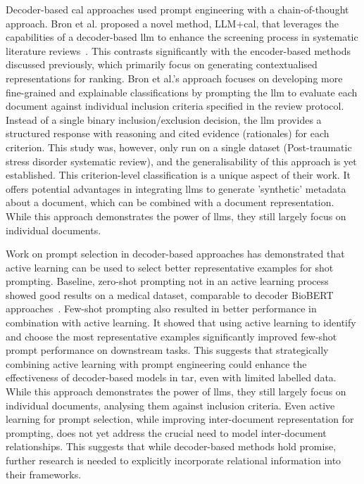 \documentclass[10pt,oneside]{book}
\begin{document}
Decoder-based \gls*{cal} approaches used prompt engineering with a chain-of-thought approach. Bron et al. proposed a novel method, LLM+\gls*{cal}, that leverages the capabilities of  a decoder-based \gls*{llm} to enhance the screening process in systematic literature reviews~\cite{bron_combining_2024}. This contrasts significantly with the encoder-based methods discussed previously, which primarily focus on generating contextualised representations for ranking. Bron et al.'s approach focuses on developing more fine-grained and explainable classifications by prompting the \gls*{llm} to evaluate each document against individual inclusion criteria specified in the review protocol. Instead of a single binary inclusion/exclusion decision, the \gls*{llm} provides a structured response with reasoning and cited evidence (rationales) for each criterion. This study was, however, only run on a single dataset (Post-traumatic stress disorder systematic review), and the generalisability of this approach is yet established. This criterion-level classification is a unique aspect of their work. It offers potential advantages in integrating \gls*{llm}s to generate 'synthetic' metadata about a document, which can be combined with a document representation. While this approach demonstrates the power of \gls*{llm}s, they still largely focus on individual documents.

Work on prompt selection in decoder-based approaches has demonstrated that active learning can be used to select better representative examples for shot prompting.  Baseline, zero-shot prompting not in an active learning process showed good results on a medical dataset, comparable to decoder BioBERT approaches~\cite{wang_zero-shot_2024}. Few-shot prompting also resulted in better performance \cite{margatina_importance_2022} in combination with active learning. It showed that using active learning to identify and choose the most representative examples significantly improved few-shot prompt performance on downstream tasks. This suggests that strategically combining active learning with prompt engineering could enhance the effectiveness of decoder-based models in \gls*{tar}, even with limited labelled data. While this approach demonstrates the power of \gls*{llm}s, they still largely focus on individual documents, analysing them against inclusion criteria. Even active learning for prompt selection, while improving inter-document representation for prompting, does not yet address the crucial need to model inter-document relationships.  This suggests that while decoder-based methods hold promise, further research is needed to explicitly incorporate relational information into their frameworks. 
\end{document}
